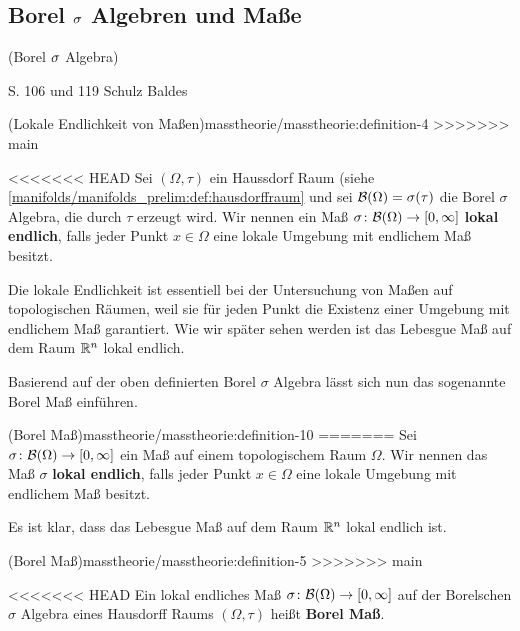 \subsection{Borel \protect\(\sigma\protect\) Algebren und  Maße}
\begin{definition}{(Borel \protect\(\sigma\protect\) Algebra)}{}\label{masstheorie/masstheorie:definition-3}



\par
S. 106 und 119 Schulz Baldes
\end{definition}
\begin{definition}{(Lokale Endlichkeit von Maßen)}{masstheorie/masstheorie:definition-4}
>>>>>>> main



\par
<<<<<<< HEAD
Sei \((\Omega, \tau)\) ein Haussdorf Raum (siehe \cref{manifolds/manifolds_prelim:def:hausdorffraum}  und sei \(\mathcal{B}(\Omega) = \sigma(\tau)\) die Borel \(\sigma\) Algebra, die durch \(\tau\) erzeugt wird.
Wir nennen ein Maß \(\sigma \colon \mathcal{B}(\Omega) \rightarrow [0, \infty]\) \textbf{lokal endlich}, falls jeder Punkt \(x \in \Omega\) eine lokale Umgebung mit endlichem Maß besitzt.
\end{definition}

\par
Die lokale Endlichkeit ist essentiell bei der Untersuchung von Maßen auf topologischen Räumen, weil sie für jeden Punkt die Existenz einer Umgebung mit endlichem Maß garantiert.
Wie wir später sehen werden ist das Lebesgue Maß auf dem Raum \(\mathbb{R}^n\) lokal endlich.

\par
Basierend auf der oben definierten Borel \(\sigma\) Algebra lässt sich nun das sogenannte Borel Maß einführen.
\begin{definition}{(Borel Maß)}{masstheorie/masstheorie:definition-10}
=======
Sei \(\sigma \colon \mathcal{B}(\Omega) \rightarrow [0, \infty]\) ein Maß auf einem topologischem Raum \(\Omega\).
Wir nennen das Maß \(\sigma\) \textbf{lokal endlich}, falls jeder Punkt \(x \in \Omega\) eine lokale Umgebung mit endlichem Maß besitzt.
\end{definition}

\par
Es ist klar, dass das Lebesgue Maß auf dem Raum \(\mathbb{R}^n\) lokal endlich ist.
\begin{definition}{(Borel Maß)}{masstheorie/masstheorie:definition-5}
>>>>>>> main



\par
<<<<<<< HEAD
Ein lokal endliches Maß \(\sigma \colon \mathcal{B}(\Omega) \rightarrow [0, \infty]\) auf der Borelschen \(\sigma\) Algebra eines Hausdorff Raums \((\Omega,\tau)\) heißt \textbf{Borel Maß}.
\end{definition}


